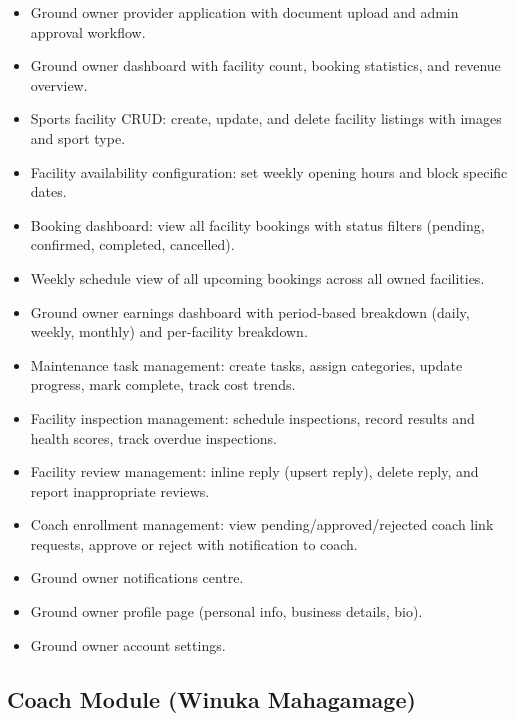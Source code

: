 \documentclass[12pt,a4paper]{report}
\begin{document}
\begin{itemize}[leftmargin=1.5cm]
  \item Ground owner provider application with document upload and admin approval workflow.
  \item Ground owner dashboard with facility count, booking statistics, and revenue overview.
  \item Sports facility CRUD: create, update, and delete facility listings with images and sport type.
  \item Facility availability configuration: set weekly opening hours and block specific dates.
  \item Booking dashboard: view all facility bookings with status filters (pending, confirmed, completed, cancelled).
  \item Weekly schedule view of all upcoming bookings across all owned facilities.
  \item Ground owner earnings dashboard with period-based breakdown (daily, weekly, monthly) and per-facility breakdown.
  \item Maintenance task management: create tasks, assign categories, update progress, mark complete, track cost trends.
  \item Facility inspection management: schedule inspections, record results and health scores, track overdue inspections.
  \item Facility review management: inline reply (upsert reply), delete reply, and report inappropriate reviews.
  \item Coach enrollment management: view pending/approved/rejected coach link requests, approve or reject with notification to coach.
  \item Ground owner notifications centre.
  \item Ground owner profile page (personal info, business details, bio).
  \item Ground owner account settings.
\end{itemize}

\subsection{Coach Module (Winuka Mahagamage)}
\end{document}
